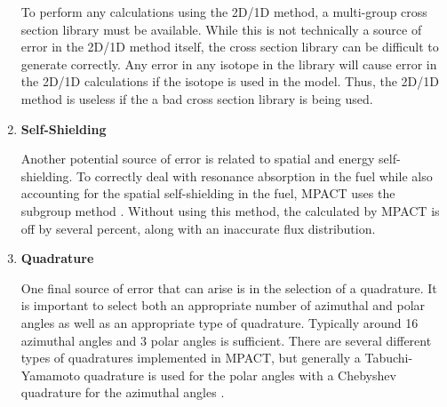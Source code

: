 \begin{enumerate}[leftmargin=*]
  To perform any calculations using the 2D/1D method, a multi-group cross section library must be available.  While this is not technically a source of error in the 2D/1D method itself, the cross section library can be difficult to generate correctly.  Any error in any isotope in the library will cause error in the 2D/1D calculations if the isotope is used in the model.  Thus, the 2D/1D method is useless if the a bad cross section library is being used.
  
  \item \textbf{Self-Shielding}
  
  Another potential source of error is related to spatial and energy self-shielding.  To correctly deal with resonance absorption in the fuel while also accounting for the spatial self-shielding in the fuel, MPACT uses the subgroup method \cite{SubgroupOrig1974,SelfShieldingMethodologyMPACT2013}.  Without using this method, the \keff{} calculated by MPACT is off by several percent, along with an inaccurate flux distribution.
  
  \item \textbf{Quadrature}
  
  One final source of error that can arise is in the selection of a quadrature.  It is important to select both an appropriate number of azimuthal and polar angles as well as an appropriate type of quadrature.  Typically around 16 azimuthal angles and 3 polar angles is sufficient.  There are several different types of quadratures implemented in MPACT, but generally a Tabuchi-Yamamoto quadrature is used for the polar angles \cite{YamamotoQuadrature2012} with a Chebyshev quadrature for the azimuthal angles \cite{HandbookOfMathFunctions1972}.
\end{enumerate}
